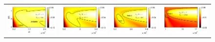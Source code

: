 \documentclass[aps,prl,twocolumn,showpacs,superscriptaddress,groupedaddress,10pt]{revtex4-1}  %
\begin{document}
\begin{figure}
\begin{tabular}{cccc}
{\includegraphics[scale = 0.72]{Set5_dens38_imgsc}} &
{\includegraphics[scale = 0.72]{Set5_dens40_imgsc}} &
{\includegraphics[scale = 0.72]{Set5_dens42_imgsc}} &
{\includegraphics[scale = 0.72]{Set5_dens46_imgsc}} \\

\end{tabular}
\end{figure}
\end{document}
